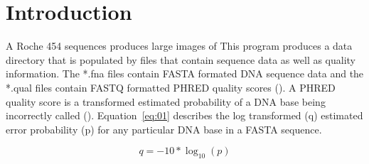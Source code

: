 \documentclass{bioinfo}
\begin{document}
\section{Introduction}
A Roche 454 sequences produces large images of 
This program produces a data directory that is populated by files that contain sequence data as well as quality information.
The *.fna files contain FASTA formated DNA sequence data and the *.qual files contain FASTQ formatted PHRED quality scores (\citealp{Cock2010}).
A PHRED quality score is a transformed estimated probability of a DNA base being incorrectly called (\citealp{Ewing1998a,Ewing1998b}). 
Equation~\ref{eq:01} describes the log transformed (q) estimated error probability (p) for any particular DNA base in a FASTA sequence.       
  
\begin{equation}
q = -10*\log_10(p)  \label{eq:01}
\end{equation}
\end{document}

